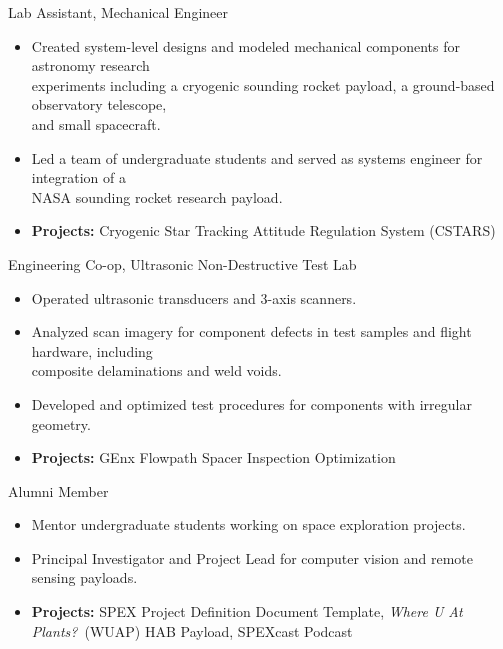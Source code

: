 \documentclass[10pt,final,sans]{resume}
\begin{document}
Lab Assistant, Mechanical Engineer
\begin{itemize}
  \item Created system-level designs and modeled mechanical components for astronomy research \\ 
  experiments including a cryogenic sounding rocket payload, a ground-based observatory telescope, \\
  and small spacecraft.
  \item Led a team of undergraduate students and served as systems engineer for integration of a \\
  NASA sounding rocket research payload.
  \item {\bf Projects:} Cryogenic Star Tracking Attitude Regulation System (CSTARS)
\end{itemize}

Engineering Co-op, Ultrasonic Non-Destructive Test Lab
\begin{itemize}
  \item Operated ultrasonic transducers and 3-axis scanners.
  \item Analyzed scan imagery for component defects in test samples and flight hardware, including \\
  composite delaminations and weld voids.
  \item Developed and optimized test procedures for components with irregular geometry.
  \item {\bf Projects:} GEnx Flowpath Spacer Inspection Optimization
\end{itemize}

Alumni Member
\begin{itemize}
  \item Mentor undergraduate students working on space exploration projects.
  \item Principal Investigator and Project Lead for computer vision and remote sensing payloads.
  \item {\bf Projects:} SPEX Project Definition Document Template, {\it Where U At Plants?}~(WUAP) HAB Payload, SPEXcast Podcast
\end{itemize}

\end{document}
